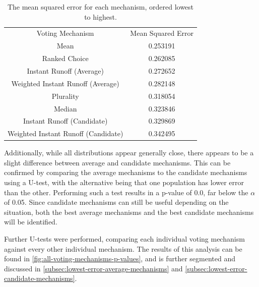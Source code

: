 \begin{table}[htbp]
    \renewcommand{\arraystretch}{1.0}

    \caption{The mean squared error for each mechanism, ordered lowest to highest.}
    \label{tab:voting-mechanism-mean-error}

    \centering
    \begin{tabular}{|c|c|}
        \hline
        Voting Mechanism                    & Mean Squared Error \\
        \hhline{|=|=|}
        Mean                                & 0.253191           \\
        \hline
        Ranked Choice                       & 0.262085           \\
        \hline
        Instant Runoff (Average)            & 0.272652           \\
        \hline
        Weighted Instant Runoff (Average)   & 0.282148           \\
        \hline
        Plurality                           & 0.318054           \\
        \hline
        Median                              & 0.323846           \\
        \hline
        Instant Runoff (Candidate)          & 0.329869           \\
        \hline
        Weighted Instant Runoff (Candidate) & 0.342495           \\
        \hline
    \end{tabular}
\end{table}

Additionally, while all distributions appear generally close, there appears to be a
slight difference between average and candidate mechanisms.
This can be confirmed by comparing the average mechanisms to the candidate mechanisms
using a U-test, with the alternative being that one population has lower error than the
other.
Performing such a test results in a p-value of 0.0, far below the $\alpha$ of 0.05.
Since candidate mechanisms can still be useful depending on the situation, both the
best average mechanisms and the best candidate mechanisms will be identified.

Further U-tests were performed, comparing each individual voting mechanism against
every other individual mechanism.
The results of this analysis can be found in
\autoref{fig:all-voting-mechanisms-p-values}, and is further segmented and discussed in
\autoref{subsec:lowest-error-average-mechanisms} and
\autoref{subsec:lowest-error-candidate-mechanisms}.

